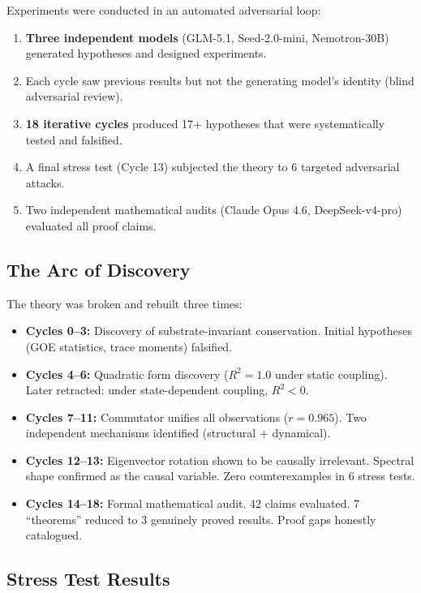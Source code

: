 \documentclass[11pt]{article}
\begin{document}
Experiments were conducted in an automated adversarial loop:
\begin{enumerate}
  \item \textbf{Three independent models} (GLM-5.1, Seed-2.0-mini, Nemotron-30B) generated hypotheses and designed experiments.
  \item Each cycle saw previous results but not the generating model's identity (blind adversarial review).
  \item \textbf{18 iterative cycles} produced 17+ hypotheses that were systematically tested and falsified.
  \item A final stress test (Cycle 13) subjected the theory to 6 targeted adversarial attacks.
  \item Two independent mathematical audits (Claude Opus 4.6, DeepSeek-v4-pro) evaluated all proof claims.
\end{enumerate}

\subsection{The Arc of Discovery}

The theory was broken and rebuilt three times:

\begin{itemize}
  \item \textbf{Cycles 0--3:} Discovery of substrate-invariant conservation. Initial hypotheses (GOE statistics, trace moments) falsified.
  \item \textbf{Cycles 4--6:} Quadratic form discovery ($R^2 = 1.0$ under static coupling). Later retracted: under state-dependent coupling, $R^2 < 0$.
  \item \textbf{Cycles 7--11:} Commutator unifies all observations ($r = 0.965$). Two independent mechanisms identified (structural + dynamical).
  \item \textbf{Cycles 12--13:} Eigenvector rotation shown to be causally irrelevant. Spectral shape confirmed as the causal variable. Zero counterexamples in 6 stress tests.
  \item \textbf{Cycles 14--18:} Formal mathematical audit. 42 claims evaluated. 7 ``theorems'' reduced to 3 genuinely proved results. Proof gaps honestly catalogued.
\end{itemize}

\subsection{Stress Test Results}
\end{document}
